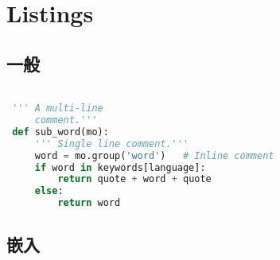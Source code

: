 \chapter{Listings}
\section{一般}
\begin{lstlisting}[language=Python, caption=This is caption of code block]

 ''' A multi-line
     comment.'''
 def sub_word(mo):
     ''' Single line comment.'''
     word = mo.group('word')   # Inline comment
     if word in keywords[language]:              
         return quote + word + quote              
     else:                                       
         return word
\end{lstlisting}

\section{嵌入}
